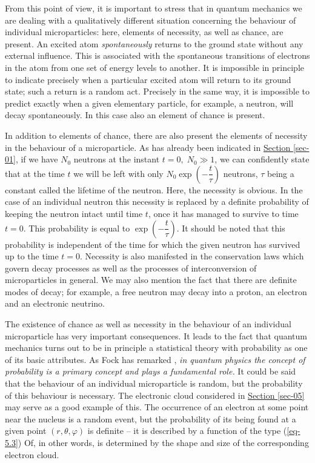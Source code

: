 \documentclass[a4paper,sfsidenotes,colorlinks=true]{tufte-book}
\numberwithin{equation}{section}
\numberwithin{figure}{section}
\begin{document}
From this point of view, it is important to stress that in quantum
mechanics we are dealing with a qualitatively different situation
concerning the behaviour of individual microparticles: here, elements
of necessity, as well as chance, are present. An excited atom
\emph{spontaneously} returns to the ground state without any external
influence. This is associated with the spontaneous transitions of
electrons in the atom from one set of energy levels to another. It is
impossible in principle to indicate precisely when a particular
excited atom will return to its ground state; such a return is a
random act. Precisely in the same way, it is impossible to predict
exactly when a given elementary particle, for example, a neutron, will
decay spontaneously. In this case also an element of chance is
present.


In addition to elements of chance, there are also present the elements
of necessity in the behaviour of a microparticle. As has already been
indicated in \hyperref[sec-01]{Section \ref{sec-01}}, if we have
$N_{0}$ neutrons at the instant $t=0, \; N_{0} \gg 1$, we can confidently
state that at the time $t$ we will be left with only $N_{0} \exp
\left( - \dfrac{t}{\tau} \right)$ neutrons, $\tau$ being a constant called the
lifetime of the neutron. Here, the necessity is obvious. In the case
of an individual neutron this necessity is replaced by a definite
probability of keeping the neutron intact until time $t$, once it has
managed to survive to time $t = 0$. This probability is equal to $
\exp \left( - \dfrac{t}{\tau} \right)$. It should be noted that this probability is
independent of the time for which the given neutron has survived up to
the time $t =0$. Necessity is also manifested in the conservation laws
which govern decay processes as well as the processes of
interconversion of microparticles in general. We may also mention the
fact that there are definite modes of decay; for example, a free
neutron may decay into a proton, an electron and an electronic
neutrino.

The existence of chance as well as necessity in the behaviour of an
individual microparticle has very important consequences. It leads to
the fact that quantum mechanics turns out to be in principle a
statistical theory with probability as one of its basic attributes. As
Fock has remarked \cite{fock-1957}, \emph{in quantum physics the
  concept of probability is a primary concept and plays a fundamental
  role.} It could be said that the behaviour of an individual
microparticle is random, but the probability of this behaviour is
necessary. The electronic cloud considered in
\hyperref[sec-05]{Section \ref{sec-05}} may serve as a good example of
this. The occurrence of an electron at some point near the nucleus is
a random event, but the probability of its being found at a given
point $(r, \theta, \varphi)$ is definite -- it is described by a
function of the type (\ref{eq-5.3}) Of, in other words, is determined
by the shape and size of the corresponding electron cloud.
\end{document}
